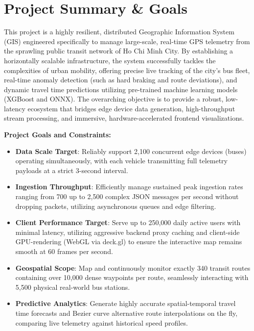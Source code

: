 \documentclass[a4paper]{article}
\begin{document}


\tableofcontents
\pagebreak

\section{Project Summary \& Goals}
This project is a highly resilient, distributed Geographic Information System (GIS) engineered specifically to manage large-scale, real-time GPS telemetry from the sprawling public transit network of Ho Chi Minh City. By establishing a horizontally scalable infrastructure, the system successfully tackles the complexities of urban mobility, offering precise live tracking of the city's bus fleet, real-time anomaly detection (such as hard braking and route deviations), and dynamic travel time predictions utilizing pre-trained machine learning models (XGBoost and ONNX). The overarching objective is to provide a robust, low-latency ecosystem that bridges edge device data generation, high-throughput stream processing, and immersive, hardware-accelerated frontend visualizations.
\medskip

\textbf{Project Goals and Constraints:}
\begin{itemize}[leftmargin=*]
    \item \textbf{Data Scale Target}: Reliably support 2,100 concurrent edge devices (buses) operating simultaneously, with each vehicle transmitting full telemetry payloads at a strict 3-second interval.
    \item \textbf{Ingestion Throughput}: Efficiently manage sustained peak ingestion rates ranging from 700 up to 2,500 complex JSON messages per second without dropping packets, utilizing asynchronous queues and edge filtering.
    \item \textbf{Client Performance Target}: Serve up to 250,000 daily active users with minimal latency, utilizing aggressive backend proxy caching and client-side GPU-rendering (WebGL via deck.gl) to ensure the interactive map remains smooth at 60 frames per second.
    \item \textbf{Geospatial Scope}: Map and continuously monitor exactly 340 transit routes containing over 10,000 dense waypoints per route, seamlessly interacting with 5,500 physical real-world bus stations.
    \item \textbf{Predictive Analytics}: Generate highly accurate spatial-temporal travel time forecasts and Bezier curve alternative route interpolations on the fly, comparing live telemetry against historical speed profiles.
\end{itemize}
\end{document}
